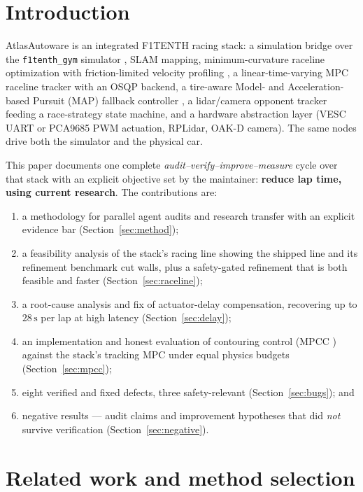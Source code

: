 \documentclass[11pt]{article}
\begin{document}
\section{Introduction}

AtlasAutoware is an integrated F1TENTH racing stack: a simulation bridge
over the \texttt{f1tenth\_gym} simulator \cite{okelly}, SLAM mapping,
minimum-curvature raceline optimization with friction-limited velocity
profiling \cite{heilmeier}, a linear-time-varying MPC raceline tracker
with an OSQP backend, a tire-aware Model- and Acceleration-based Pursuit
(MAP) fallback controller \cite{becker}, a lidar/camera opponent tracker
feeding a race-strategy state machine, and a hardware abstraction layer
(VESC UART or PCA9685 PWM actuation, RPLidar, OAK-D camera).  The same
nodes drive both the simulator and the physical car.

This paper documents one complete
\emph{audit--verify--improve--measure} cycle over that stack with an
explicit objective set by the maintainer: \textbf{reduce lap time, using
current research}.  The contributions are:
\begin{enumerate}
  \item a methodology for parallel agent audits and research transfer
        with an explicit evidence bar (Section~\ref{sec:method});
  \item a feasibility analysis of the stack's racing line showing the
        shipped line and its refinement benchmark cut walls, plus a
        safety-gated refinement that is both feasible and faster
        (Section~\ref{sec:raceline});
  \item a root-cause analysis and fix of actuator-delay compensation,
        recovering up to $28\,\mathrm{s}$ per lap at high latency
        (Section~\ref{sec:delay});
  \item an implementation and honest evaluation of contouring control
        (MPCC \cite{liniger,cimpcc}) against the stack's tracking MPC
        under equal physics budgets (Section~\ref{sec:mpcc});
  \item eight verified and fixed defects, three safety-relevant
        (Section~\ref{sec:bugs}); and
  \item negative results --- audit claims and improvement hypotheses
        that did \emph{not} survive verification
        (Section~\ref{sec:negative}).
\end{enumerate}

\section{Related work and method selection}
\label{sec:related}
\end{document}
